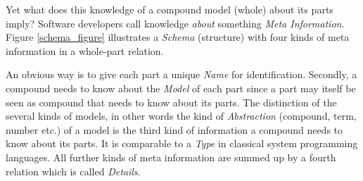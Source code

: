 Yet what does this knowledge of a compound model (whole) about its parts imply?
Software developers call knowledge \emph{about} something
\emph{Meta Information}. Figure \ref{schema_figure} illustrates a
\emph{Schema} (structure) with four kinds of meta information in a whole-part
relation.

An obvious way is to give each part a unique \emph{Name} for identification.
Secondly, a compound needs to know about the \emph{Model} of each part since a
part may itself be seen as compound that needs to know about its parts. The
distinction of the several kinds of models, in other words the kind of
\emph{Abstraction} (compound, term, number etc.) of a model is the third kind
of information a compound needs to know about its parts. It is comparable to a
\emph{Type} in classical system programming languages. All further kinds of
meta information are summed up by a fourth relation which is called
\emph{Details}.
